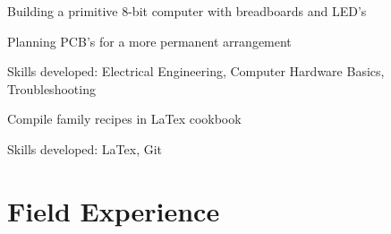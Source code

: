 \documentclass[letterpaper]{resume}
\begin{document}
\begin{compactitem}
\item Building a primitive 8-bit computer with breadboards and LED's
\item Planning PCB's for a more permanent arrangement
\item Skills developed: Electrical Engineering, Computer Hardware Basics, Troubleshooting
\end{compactitem}

\begin{compactitem}
\item Compile family recipes in LaTex cookbook
\item Skills developed: LaTex, Git
\end{compactitem}

\section{Field Experience}
\end{document}
